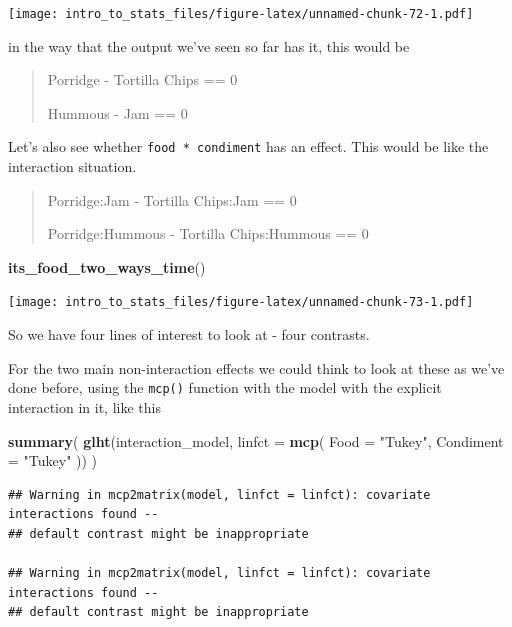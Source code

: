 \documentclass[
]{book}
\newenvironment{Shaded}{\begin{snugshade}}{\end{snugshade}}
\newcommand{\DataTypeTok}[1]{\textcolor[rgb]{0.13,0.29,0.53}{#1}}
\newcommand{\KeywordTok}[1]{\textcolor[rgb]{0.13,0.29,0.53}{\textbf{#1}}}
\newcommand{\NormalTok}[1]{#1}
\newcommand{\StringTok}[1]{\textcolor[rgb]{0.31,0.60,0.02}{#1}}
\begin{document}
\texttt{[image: intro\_to\_stats\_files/figure-latex/unnamed-chunk-72-1.pdf]}

in the way that the output we've seen so far has it, this would be

\begin{quote}
Porridge - Tortilla Chips == 0

Hummous - Jam == 0
\end{quote}

Let's also see whether \texttt{food\ *\ condiment} has an effect. This would be like the interaction situation.

\begin{quote}
Porridge:Jam - Tortilla Chips:Jam == 0

Porridge:Hummous - Tortilla Chips:Hummous == 0
\end{quote}

\begin{Shaded}
\begin{Highlighting}[]
\KeywordTok{its_food_two_ways_time}\NormalTok{()}
\end{Highlighting}
\end{Shaded}

\texttt{[image: intro\_to\_stats\_files/figure-latex/unnamed-chunk-73-1.pdf]}

So we have four lines of interest to look at - four contrasts.

For the two main non-interaction effects we could think to look at these as we've done before, using the \texttt{mcp()} function with the model with the explicit interaction in it, like this

\begin{Shaded}
\begin{Highlighting}[]
\KeywordTok{summary}\NormalTok{(}
  \KeywordTok{glht}\NormalTok{(interaction_model, }\DataTypeTok{linfct =} \KeywordTok{mcp}\NormalTok{(}
    \DataTypeTok{Food =} \StringTok{"Tukey"}\NormalTok{,}
    \DataTypeTok{Condiment =} \StringTok{"Tukey"}
\NormalTok{  ))}
\NormalTok{)}
\end{Highlighting}
\end{Shaded}

\begin{verbatim}
## Warning in mcp2matrix(model, linfct = linfct): covariate interactions found --
## default contrast might be inappropriate

## Warning in mcp2matrix(model, linfct = linfct): covariate interactions found --
## default contrast might be inappropriate
\end{verbatim}
\end{document}
